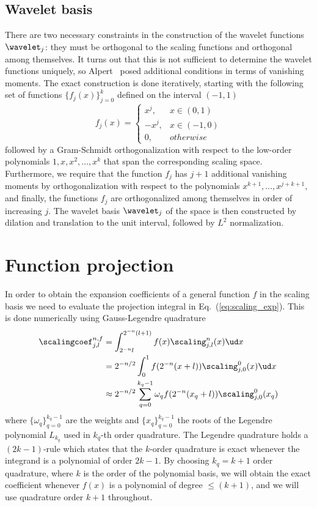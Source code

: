 \subsection{Wavelet basis}
There are two necessary constraints in the construction of the wavelet functions
$\wavelet_j$: they must be orthogonal to the scaling functions and orthogonal among 
themselves. It turns out that this is not sufficient to determine the wavelet functions
uniquely, so Alpert~\cite{Alpert} posed additional conditions in terms of vanishing 
moments. The exact construction is done iteratively, starting with the following set 
of functions $\lbrace f_j(x) \rbrace_{j=0}^k$ defined on the interval $(-1,1)$
\begin{equation}
    f_j(x) = 
    \left\{
	\begin{array}{lll}
	    x^j,	& x \in (0,1)\\
	    -x^j,	& x \in (-1,0)\\
	    0,		& otherwise
	\end{array}
    \right.
\end{equation}
followed by a Gram-Schmidt orthogonalization with respect to the low-order polynomials
$1,x,x^2,\dots,x^k$ that span the corresponding scaling space. Furthermore, we require
that the function $f_j$ has $j+1$ additional vanishing moments by orthogonalization 
with respect to the polynomials $x^{k+1},\dots,x^{j+k+1}$, and finally, the functions
$f_j$ are orthogonalized among themselves in order of increasing $j$. The wavelet basis 
$\wavelet_j$ of the space  is then constructed by dilation and 
translation to the unit interval, followed by $L^2$ normalization.

\section{Function projection}
In order to obtain the expansion coefficients of a general function $f$ in the 
scaling basis we need to evaluate the projection integral in 
Eq.~(\ref{eq:scaling_exp}). This is done numerically using Gauss-Legendre quadrature
\begin{align}
    \scalingcoef_{j,l}^{n,f} 
	&= \int_{2^{-n}l}^{2^{-n}(l+1)} f(x)\scaling_{j,l}^n(x)\ud x\\
	&= 2^{-n/2}\int_0^1 f(2^{-n}(x+l)) \scaling_{j,0}^0(x)\ud x\\
	\label{eq:quadrature}
	&\approx 2^{-n/2}\sum_{q=0}^{k_q-1} \omega_q f(2^{-n}(x_q+l)) 
			\scaling_{j,0}^0(x_q)
\end{align}
where $\lbrace \omega_q\rbrace_{q=0}^{k_q-1}$ are the weights and
$\lbrace x_q\rbrace_{q=0}^{k_q-1}$ the roots of the Legendre polynomial $L_{k_q}$ 
used in $k_q$-th order quadrature. The Legendre quadrature holds a $(2k-1)$-rule 
which states that the $k$-order quadrature is exact whenever the integrand is a 
polynomial of order $2k-1$. By choosing $k_q = k+1$ order quadrature, where $k$ is
the order of the polynomial basis, we will obtain the exact coefficient
whenever $f(x)$ is a polynomial of degree $\leq (k+1)$, and we will use quadrature 
order $k+1$ throughout.

